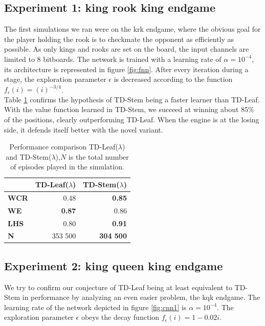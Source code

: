 \documentclass[twocolumn]{phdsymp} %
\begin{document}
\subsection{Experiment 1: king rook king endgame}
The first simulations we ran were on the \gls{krk} endgame, where the obvious goal for the player holding the rook is to checkmate the opponent as efficiently as possible. As only kings and rooks are set on the board, the input channels are limited to 8 bitboards. The network is trained with a learning rate of $\alpha=10^{-4}$, its architecture is represented in figure \ref{fig:fnn}. After every iteration during a stage, the exploration parameter $\epsilon$ is decreased according to the function $f_\epsilon(i)=(i)^{-3/4}$.\\
Table \ref{tab:perf_krk} confirms the hypothesis of TD-Stem being a faster learner than TD-Leaf. With the value function learned in TD-Stem, we succeed at winning about 85\% of the positions, clearly outperforming TD-Leaf. When the engine is at the losing side, it defends itself better with the novel variant.
\begin{table}[]
\centering
\caption{Performance comparison TD-Leaf($\lambda$) and TD-Stem($\lambda$),$N$ is the total number of episodes played in the simulation.}
\label{tab:perf_krk}
\begin{tabular}{l|rr}
    & \multicolumn{1}{l}{\textbf{TD-Leaf($\lambda$)}} & \multicolumn{1}{l}{ \textbf{TD-Stem($\lambda$)}} \\ \hline
\textbf{WCR} & 0.48                                   & \textbf{0.85}                          \\
\textbf{WE}  & \textbf{0.87}                          & 0.86                                   \\
\textbf{LHS} & 0.80                                   & \textbf{0.91}                          \\
\textbf{N }  & 353 500                                & \textbf{304 500}                      
\end{tabular}
\end{table}
\subsection{Experiment 2: king queen king endgame}
We try to confirm our conjecture of TD-Leaf being at least equivalent to TD-Stem in performance by analyzing an even easier problem, the \gls{kqk} endgame. The learning rate of the network depicted in figure \ref{fig:cnn1} is $\alpha=10^{-4}$. The exploration parameter $\epsilon$ obeys the decay function $f_{\epsilon}(i)=1-0.02i$.\\
\end{document}
